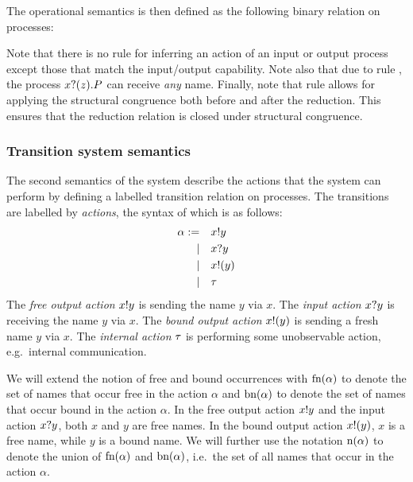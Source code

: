 The operational semantics is then defined as the following binary relation on processes:
Note that there is no rule for inferring an action of an input or output process except those that match the input/output capability.
Note also that due to rule , the process \( x ? (z) . P \) can receive \emph{any} name.
Finally, note that rule  allows for applying the structural congruence both before and after the reduction.
This ensures that the reduction relation is closed under structural congruence.

\subsubsection{Transition system semantics}
The second semantics of the system describe the actions that the system can perform by defining a labelled transition relation on processes.
The transitions are labelled by \emph{actions}, the syntax of which is as follows:
\begin{align*}
  \alpha := &&& x ! y \\
  |&&& x ? y \\
  |&&& x ! (y) \\
  |&&& \tau
\end{align*}
The \emph{free output action} \( x ! y \) is sending the name \( y \) via \( x \).
The \emph{input action} \( x ? y \) is receiving the name \( y \) via \( x \).
The \emph{bound output action} \( x ! (y) \) is sending a fresh name \( y \) via \( x \).
The \emph{internal action} \( \tau \) is performing some unobservable action, e.g.\ internal communication.

We will extend the notion of free and bound occurrences with 
\( \textrm{fn}(\alpha) \) to denote the set of names that occur free in
the action \( \alpha \) and  \( \textrm{bn}(\alpha) \) to
denote the set of names that occur bound in the action \( \alpha \).
In the free output action \( x ! y \) and the input action
\( x ? y \), both \( x \) and \( y \) are free names.  In the
bound output action \( x ! (y) \), \( x \) is a free name, while
\( y \) is a bound name.  We will further use the notation
\( \textrm{n}(\alpha) \) to denote the union of \( \textrm{fn}(\alpha) \)
and \( \textrm{bn}(\alpha) \), i.e.\ the set of all names that occur
in the action \( \alpha \).


